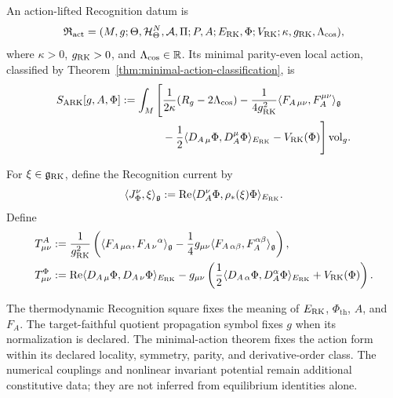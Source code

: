 \begin{definition}
An action-lifted Recognition datum is
\[
\mathfrak R_{\mathrm{act}}
=(M,g;\Theta,\mathcal H^N_\Theta,\mathcal A,\Pi;
 P,A;E_{\mathrm{RK}},\Phi;V_{\mathrm{RK}};
 \kappa,g_{\mathrm{RK}},\Lambda_{\mathrm{cos}}),
\]
where $\kappa>0$, $g_{\mathrm{RK}}>0$, and $\Lambda_{\mathrm{cos}}\in\mathbb R$.  Its minimal parity-even local action, classified by Theorem~\ref{thm:minimal-action-classification}, is
\begin{equation}
\begin{split}
S_{\mathrm{ARK}}[g,A,\Phi]
:=\int_M\Bigg[
&\frac{1}{2\kappa}(R_g-2\Lambda_{\mathrm{cos}})
-\frac{1}{4g_{\mathrm{RK}}^2}
 \langle F_{A\,\mu\nu},F_A^{\mu\nu}\rangle_{\mathfrak g}
\\
&-\frac12\langle D_{A\,\mu}\Phi,D_A^{\mu}\Phi\rangle_{E_{\mathrm{RK}}}
-V_{\mathrm{RK}}(\Phi)
\Bigg]\,\mathrm{vol}_g.
\end{split}
\label{eq:ark-action}
\end{equation}
\end{definition}

For $\xi\in\mathfrak g_{\mathrm{RK}}$, define the Recognition current by
\begin{equation}
\langle J_\Phi^\nu,\xi\rangle_{\mathfrak g}
:=\operatorname{Re}\langle D_A^\nu\Phi,\rho_*(\xi)\Phi\rangle_{E_{\mathrm{RK}}}.
\label{eq:recognition-current}
\end{equation}
Define
\begin{align}
T^{A}_{\mu\nu}
&:=\frac{1}{g_{\mathrm{RK}}^2}
\left(
\langle F_{A\,\mu\alpha},F_{A\,\nu}{}^{\alpha}\rangle_{\mathfrak g}
-\frac14g_{\mu\nu}
 \langle F_{A\,\alpha\beta},F_A^{\alpha\beta}\rangle_{\mathfrak g}
\right),
\label{eq:gauge-stress}\\
T^{\Phi}_{\mu\nu}
&:=\operatorname{Re}\langle D_{A\,\mu}\Phi,D_{A\,\nu}\Phi\rangle_{E_{\mathrm{RK}}}
-g_{\mu\nu}
\left(
\frac12\langle D_{A\,\alpha}\Phi,D_A^{\alpha}\Phi\rangle_{E_{\mathrm{RK}}}
+V_{\mathrm{RK}}(\Phi)
\right).
\label{eq:recognition-stress}
\end{align}

The thermodynamic Recognition square fixes the meaning of $E_{\mathrm{RK}}$, $\Phi_{\mathrm{th}}$, $A$, and $F_A$.  The target-faithful quotient propagation symbol fixes $g$ when its normalization is declared.  The minimal-action theorem fixes the action form within its declared locality, symmetry, parity, and derivative-order class.  The numerical couplings and nonlinear invariant potential remain additional constitutive data; they are not inferred from equilibrium identities alone.

